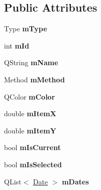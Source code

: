 \subsection*{Public Attributes}
\begin{DoxyCompactItemize}
\item 
\hypertarget{class_event_a66001700adf5ac34d492ff1e983b1d75}{Type {\bfseries m\-Type}}\label{class_event_a66001700adf5ac34d492ff1e983b1d75}

\item 
\hypertarget{class_event_a97a9b6d692bc9b4bbcbce6dfa8dddff2}{int {\bfseries m\-Id}}\label{class_event_a97a9b6d692bc9b4bbcbce6dfa8dddff2}

\item 
\hypertarget{class_event_aedaf3798d8d2bfea25f5e1f3a5e871bd}{Q\-String {\bfseries m\-Name}}\label{class_event_aedaf3798d8d2bfea25f5e1f3a5e871bd}

\item 
\hypertarget{class_event_a865443c62720fd7f9c5fbad2fd778b09}{Method {\bfseries m\-Method}}\label{class_event_a865443c62720fd7f9c5fbad2fd778b09}

\item 
\hypertarget{class_event_a29284bd3194863255d5f5c596dc66428}{Q\-Color {\bfseries m\-Color}}\label{class_event_a29284bd3194863255d5f5c596dc66428}

\item 
\hypertarget{class_event_a8d6e7ae821856255e41d0bcf266308fc}{double {\bfseries m\-Item\-X}}\label{class_event_a8d6e7ae821856255e41d0bcf266308fc}

\item 
\hypertarget{class_event_a25a5619d1084e716c8477631577692f4}{double {\bfseries m\-Item\-Y}}\label{class_event_a25a5619d1084e716c8477631577692f4}

\item 
\hypertarget{class_event_a568c1a6cbacbc356ba54f95d6dc63e4d}{bool {\bfseries m\-Is\-Current}}\label{class_event_a568c1a6cbacbc356ba54f95d6dc63e4d}

\item 
\hypertarget{class_event_a8bb7ee683da0fe1b512a00a7970eef38}{bool {\bfseries m\-Is\-Selected}}\label{class_event_a8bb7ee683da0fe1b512a00a7970eef38}

\item 
\hypertarget{class_event_a9d16dd7bb62ef1ae839f01ce5dcd010e}{Q\-List$<$ \hyperlink{class_date}{Date} $>$ {\bfseries m\-Dates}}\label{class_event_a9d16dd7bb62ef1ae839f01ce5dcd010e}


\end{DoxyCompactItemize}
